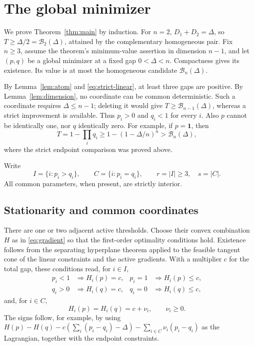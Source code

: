 \documentclass[11pt]{article}
\numberwithin{equation}{section}
\theoremstyle{remark}\newtheorem{remark}[theorem]{Remark}
\newcommand{\one}{\mathbf 1}
\newcommand{\Bcal}{\mathcal B}
\begin{document}
\section{The global minimizer}
We prove Theorem~\ref{thm:main} by induction. For $n=2$,
$D_1+D_2=\Delta$, so $T\ge\Delta/2=\Bcal_2(\Delta)$, attained by the
complementary homogeneous pair. Fix $n\ge3$, assume the theorem's
minimum-value assertion in dimension $n-1$, and let $(p,q)$ be a global
minimizer at a fixed gap $0<\Delta<n$. Compactness gives its existence.
Its value is at most the homogeneous candidate $\Bcal_n(\Delta)$.

By Lemma~\ref{lem:atom} and \eqref{eq:strict-linear}, at least three
gaps are positive. By Lemma~\ref{lem:dimension}, no coordinate can be
common deterministic. Such a coordinate requires $\Delta\le n-1$;
deleting it would give
$T\ge\Bcal_{n-1}(\Delta)$, whereas a strict improvement is available.
Thus $p_i>0$ and $q_i<1$ for every $i$. Also $p$ cannot be identically
one, nor $q$ identically zero. For example, if $p=\one$, then
\[
 T=1-\prod_iq_i\ge1-(1-\Delta/n)^n>\Bcal_n(\Delta),
\]
where the strict endpoint comparison was proved above.

Write
\[
 I=\{i:p_i>q_i\},\qquad C=\{i:p_i=q_i\},\qquad
 r=|I|\ge3,\quad s=|C|.
\]
All common parameters, when present, are strictly interior.

\subsection{Stationarity and common coordinates}
There are one or two adjacent active thresholds. Choose their convex
combination $H$ as in \eqref{eq:gradient} so that the first-order
optimality conditions hold. Existence follows from the separating
hyperplane theorem applied to the feasible tangent cone of the linear
constraints and the active gradients. With a multiplier $c$ for the
total gap, these conditions read, for $i\in I$,
\begin{align}
 p_i<1&\Longrightarrow H_i(p)=c,&p_i=1&\Longrightarrow H_i(p)\le c,
 \label{eq:KKTp}\\
 q_i>0&\Longrightarrow H_i(q)=c,&q_i=0&\Longrightarrow H_i(q)\le c,
 \label{eq:KKTq}
\end{align}
and, for $i\in C$,
\begin{equation}\label{eq:KKTC}
 H_i(p)=H_i(q)=c+\nu_i,\qquad \nu_i\ge0.
\end{equation}
The signs follow, for example, by using
$H(p)-H(q)-c(\sum_i(p_i-q_i)-\Delta)-\sum_{i\in C}\nu_i(p_i-q_i)$
as the Lagrangian, together with the endpoint constraints.
\end{document}
